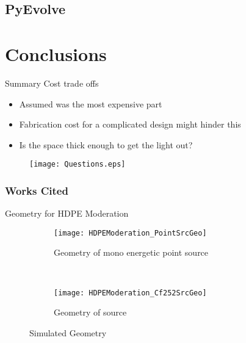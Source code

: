 \documentclass[compress]{beamer}
\begin{document}
\subsection{PyEvolve}


\section{Conclusions}
\begin{frame}{Summary}
Cost trade offs
\begin{itemize}
	\item Assumed  was the most expensive part
	\item Fabrication cost for a complicated design might hinder this
	\item Is the space thick enough to get the light out?
\end{itemize}
\begin{figure}
	\centering
  \texttt{[image: Questions.eps]}
\end{figure}
\end{frame}

\begin{frame}
\frametitle{Works Cited}
	\tiny
  
\end{frame}

\begin{frame}{Geometry for HDPE Moderation}
\begin{figure}
  \begin{subfigure}[b]{0.45\textwidth}
    \centering
    \texttt{[image: HDPEModeration\_PointSrcGeo]}
    \caption{Geometry of mono energetic point source}
  \end{subfigure}%
  ~
  \begin{subfigure}[b]{0.45\textwidth}
    \centering
    \texttt{[image: HDPEModeration\_Cf252SrcGeo]}
    \caption{Geometry of  source}
  \end{subfigure}
  \caption{Simulated Geometry}
\end{figure}
\end{frame}
\end{document}
